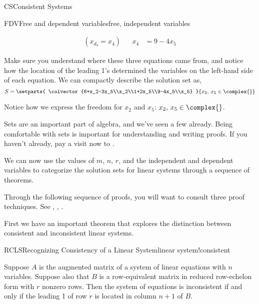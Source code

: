 \begin{subsect}{CS}{Consistent Systems}
\begin{example}{FDV}{Free and dependent variables}{free, independent variables}
\begin{para}
\begin{align*}
(x_{d_3}=x_4)& & x_4&=9-4x_5
\end{align*}
\end{para}
%
\begin{para}Make sure you understand where these three equations came from, and notice how the location of the leading 1's determined the variables on the left-hand side of each equation.  We can compactly describe the solution set as,
%
\begin{equation*}
S=
\setparts{
\colvector{6+x_2-3x_5\\x_2\\1+2x_5\\9-4x_5\\x_5}
}{x_2,\,x_5\in\complex{\null}}
\end{equation*}
\end{para}
%
\begin{para}Notice how we express the freedom for $x_2$ and $x_5$: $x_2,\,x_5\in\complex{\null}$.\end{para}
%
\end{example}
%
%
\begin{para}Sets are an important part of algebra, and we've seen a few already.  Being comfortable with sets is important for understanding and writing proofs.  If you haven't already, pay a visit now to .\end{para}
%
\begin{para}We can now use the values of $m$, $n$, $r$, and the independent and dependent variables to categorize the solution sets for linear systems through a sequence of theorems.\end{para}
%
\begin{para}Through the following sequence of proofs, you will want to consult three proof techniques. See , , .\end{para}
%
\begin{para}First we have an important theorem that explores the distinction between consistent and inconsistent linear systems.\end{para}
%
\begin{theorem}{RCLS}{Recognizing Consistency of a Linear System}{linear system!consistent}
\begin{para}Suppose $A$ is the augmented matrix of a system of linear equations with $n$ variables.  Suppose also that $B$ is a row-equivalent matrix in reduced row-echelon form with $r$ nonzero rows.  Then the system of equations is inconsistent if and only if the leading 1 of row $r$ is located in column $n+1$ of $B$.\end{para}

\end{theorem}
\end{subsect}
